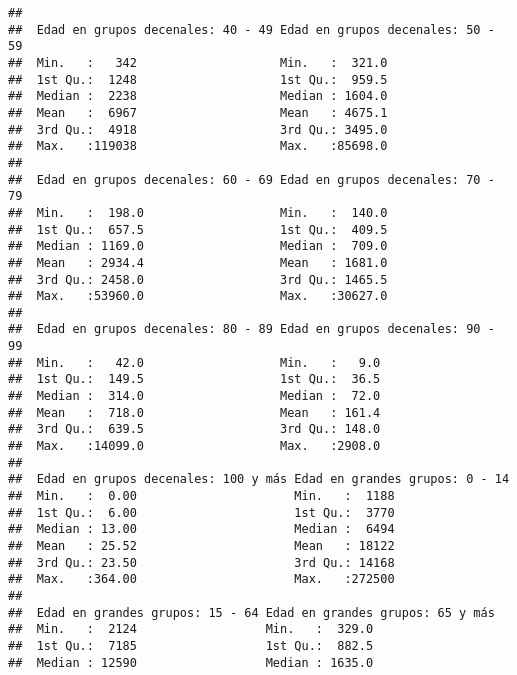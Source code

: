 \documentclass[11pt,]{article}
\begin{document}
\begin{verbatim}
##                                                                     
##  Edad en grupos decenales: 40 - 49 Edad en grupos decenales: 50 - 59
##  Min.   :   342                    Min.   :  321.0                  
##  1st Qu.:  1248                    1st Qu.:  959.5                  
##  Median :  2238                    Median : 1604.0                  
##  Mean   :  6967                    Mean   : 4675.1                  
##  3rd Qu.:  4918                    3rd Qu.: 3495.0                  
##  Max.   :119038                    Max.   :85698.0                  
##                                                                     
##  Edad en grupos decenales: 60 - 69 Edad en grupos decenales: 70 - 79
##  Min.   :  198.0                   Min.   :  140.0                  
##  1st Qu.:  657.5                   1st Qu.:  409.5                  
##  Median : 1169.0                   Median :  709.0                  
##  Mean   : 2934.4                   Mean   : 1681.0                  
##  3rd Qu.: 2458.0                   3rd Qu.: 1465.5                  
##  Max.   :53960.0                   Max.   :30627.0                  
##                                                                     
##  Edad en grupos decenales: 80 - 89 Edad en grupos decenales: 90 - 99
##  Min.   :   42.0                   Min.   :   9.0                   
##  1st Qu.:  149.5                   1st Qu.:  36.5                   
##  Median :  314.0                   Median :  72.0                   
##  Mean   :  718.0                   Mean   : 161.4                   
##  3rd Qu.:  639.5                   3rd Qu.: 148.0                   
##  Max.   :14099.0                   Max.   :2908.0                   
##                                                                     
##  Edad en grupos decenales: 100 y más Edad en grandes grupos: 0 - 14
##  Min.   :  0.00                      Min.   :  1188                
##  1st Qu.:  6.00                      1st Qu.:  3770                
##  Median : 13.00                      Median :  6494                
##  Mean   : 25.52                      Mean   : 18122                
##  3rd Qu.: 23.50                      3rd Qu.: 14168                
##  Max.   :364.00                      Max.   :272500                
##                                                                    
##  Edad en grandes grupos: 15 - 64 Edad en grandes grupos: 65 y más
##  Min.   :  2124                  Min.   :  329.0                 
##  1st Qu.:  7185                  1st Qu.:  882.5                 
##  Median : 12590                  Median : 1635.0                 

\end{verbatim}
\end{document}
